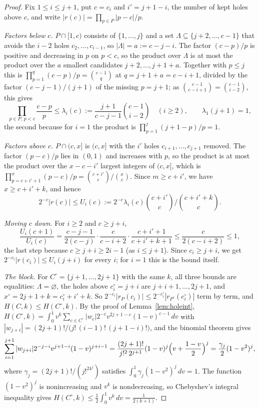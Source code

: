 \documentclass[11pt]{article}
\begin{document}
\begin{proof}
Fix $1\le i\le j+1$, put $c=c_i$ and $i'=j+1-i$, the number of kept holes
above $c$, and write $|r(c)|=\prod_{p\in P}|p-c|/p$.

\emph{Factors below $c$.}  $P\cap[1,c)$ consists of $\{1,\ldots,j\}$ and a
set $\Lambda\subseteq\{j+2,\ldots,c-1\}$ that avoids the $i-2$ holes
$c_2,\ldots,c_{i-1}$, so $|\Lambda|=a:=c-j-i$.  The factor $(c-p)/p$ is
positive and decreasing in $p$ on $p<c$, so the product over $\Lambda$ is at
most the product over the $a$ smallest candidates $j+2,\ldots,j+1+a$.
Together with $p\le j$ this is $\prod_{p=1}^{q}(c-p)/p=\binom{c-1}q$ at
$q=j+1+a=c-i+1$, divided by the factor $(c-j-1)/(j+1)$ of the missing
$p=j+1$; as $\binom{c-1}{c-i+1}=\binom{c-1}{i-2}$, this gives
\[
  \prod_{p\in P,\,p<c}\frac{c-p}p\le\lambda_i(c):=
  \frac{j+1}{c-j-1}\binom{c-1}{i-2}\quad(i\ge2),\qquad\lambda_1(j+1)=1,
\]
the second because for $i=1$ the product is
$\prod_{p=1}^{j}(j+1-p)/p=1$.

\emph{Factors above $c$.}  $P\cap(c,x]$ is $(c,x]$ with the $i'$ holes
$c_{i+1},\ldots,c_{j+1}$ removed.  The factor $(p-c)/p$ lies in $(0,1)$ and
increases with $p$, so the product is at most the product over the
$x-c-i'$ largest integers of $(c,x]$, which is
$\prod_{p=c+i'+1}^{x}(p-c)/p=\binom{c+i'}c\big/\binom xc$.  Since
$m\ge c+i'$, we have $x\ge c+i'+k$, and hence
\[
  2^{-c}|r(c)|\le U_i(c):=2^{-c}\lambda_i(c)
        \binom{c+i'}c\Big/\binom{c+i'+k}c .
\]

\emph{Moving $c$ down.}  For $i\ge2$ and $c\ge j+i$,
\[
  \frac{U_i(c+1)}{U_i(c)}
  =\frac{c-j-1}{2(c-j)}\cdot\frac c{c-i+2}\cdot\frac{c+i'+1}{c+i'+k+1}
  \le\frac c{2(c-i+2)}\le1,
\]
the last step because $c\ge j+i\ge2i-1$ (as $i\le j+1$).  Since
$c_i\ge j+i$, we get $2^{-c_i}|r(c_i)|\le U_i(j+i)$ for every $i$; for $i=1$
this is the bound itself.

\emph{The block.}  For $C^\circ=\{j+1,\ldots,2j+1\}$ with the same $k$, all
three bounds are equalities: $\Lambda=\varnothing$, the holes above
$c_i^\circ=j+i$ are $j+i+1,\ldots,2j+1$, and $x^\circ=2j+1+k=c_i^\circ+i'+k$.
So $2^{-c_i}|r_P(c_i)|\le2^{-c_i^\circ}|r_{P^\circ}(c_i^\circ)|$ term by term,
and $H(C,k)\le H(C^\circ,k)$.  By the proof of Lemma~\ref{lem:holeint},
$H(C^\circ,k)=\int_0^1v^k\sum_{c\in C^\circ}|w_c|2^{-c}v^{2j+1-c}(1-v)^{c-1}\,dv$
with $|w_{j+i}|=(2j+1)!/\bigl(j!\,(i-1)!\,(j+1-i)!\bigr)$, and the binomial
theorem gives
\[
  \sum_{i=1}^{j+1}|w_{j+i}|2^{-j-i}v^{j+1-i}(1-v)^{j+i-1}
  =\frac{(2j+1)!}{j!^2\,2^{j+1}}(1-v)^j\Bigl(v+\frac{1-v}2\Bigr)^j
  =\frac{\gamma_j}2(1-v^2)^j,
\]
where $\gamma_j=(2j+1)!/(j!^24^j)$ satisfies
$\int_0^1\gamma_j(1-v^2)^j\,dv=1$.  The function $(1-v^2)^j$ is
nonincreasing and $v^k$ is nondecreasing, so Chebyshev's integral inequality
gives $H(C^\circ,k)\le\frac12\int_0^1v^k\,dv=\frac1{2(k+1)}$.
\end{proof}
\end{document}
